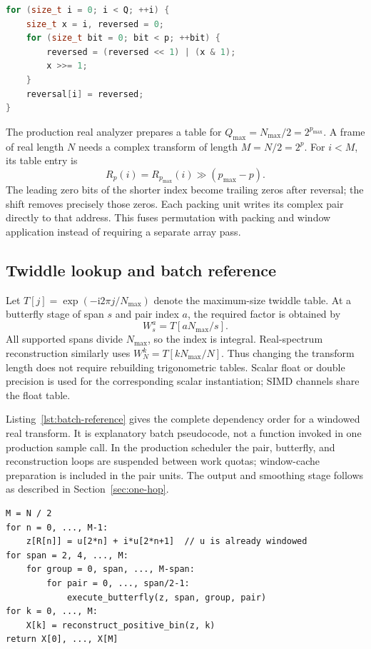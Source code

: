 \documentclass[11pt,letterpaper]{article}
\begin{document}
\begin{lstlisting}[language=C++,caption={Reference construction of a bit-reversal table for $Q=2^p$.},label={lst:reverse-table}]
for (size_t i = 0; i < Q; ++i) {
    size_t x = i, reversed = 0;
    for (size_t bit = 0; bit < p; ++bit) {
        reversed = (reversed << 1) | (x & 1);
        x >>= 1;
    }
    reversal[i] = reversed;
}
\end{lstlisting}

The production real analyzer prepares a table for
$Q_{\max}=N_{\max}/2=2^{p_{\max}}$. A frame of real length $N$ needs a
complex transform of length $M=N/2=2^p$. For $i<M$, its table entry is
\begin{equation}
 R_p(i)=R_{p_{\max}}(i)\mathbin{\gg}(p_{\max}-p).
 \label{eq:reverse-reuse}
\end{equation}
The leading zero bits of the shorter index become trailing zeros after
reversal; the shift removes precisely those zeros. Each packing unit writes
its complex pair directly to that address. This fuses permutation with
packing and window application instead of requiring a separate array pass.

\subsection{Twiddle lookup and batch reference}
Let $T[j]=\exp(-\mathrm{i}2\pi j/N_{\max})$ denote the maximum-size twiddle
table. At a butterfly stage of span $s$ and pair index $a$, the required
factor is obtained by
\begin{equation}
 W_s^a=T[aN_{\max}/s].
 \label{eq:twiddle-reuse}
\end{equation}
All supported spans divide $N_{\max}$, so the index is integral. Real-spectrum
reconstruction similarly uses $W_N^k=T[kN_{\max}/N]$. Thus changing the
transform length does not require rebuilding trigonometric tables. Scalar
float or double precision is used for the corresponding scalar instantiation;
SIMD channels share the float table.

Listing~\ref{lst:batch-reference} gives the complete dependency order for a
windowed real transform. It is explanatory batch pseudocode, not a function
invoked in one production sample call. In the production scheduler the pair,
butterfly, and reconstruction loops are suspended between work quotas;
window-cache preparation is included in the pair units. The output and
smoothing stage follows as described in Section~\ref{sec:one-hop}.

\begin{lstlisting}[caption={Batch reference for the packed real transform. R is the bit-reversal table for M; butterfly updates use Equation~\eqref{eq:butterfly}, and reconstruction uses Equation~\eqref{eq:real} and its endpoint rules.},label={lst:batch-reference}]
M = N / 2
for n = 0, ..., M-1:
    z[R[n]] = u[2*n] + i*u[2*n+1]  // u is already windowed
for span = 2, 4, ..., M:
    for group = 0, span, ..., M-span:
        for pair = 0, ..., span/2-1:
            execute_butterfly(z, span, group, pair)
for k = 0, ..., M:
    X[k] = reconstruct_positive_bin(z, k)
return X[0], ..., X[M]
\end{lstlisting}
\end{document}
